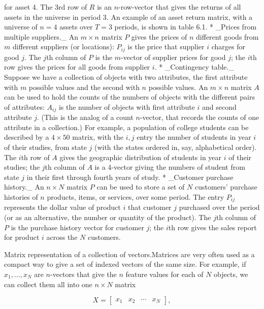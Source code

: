 for asset 4. The 3rd row of \(R\) is an \(n\)-row-vector that gives the returns of all assets in the universe in period 3. An example of an asset return matrix, with a universe of \(n=4\) assets over \(T=3\) periods, is shown in table 6.1.
* _Prices from multiple suppliers._ An \(m\times n\) matrix \(P\) gives the prices of \(n\) different goods from \(m\) different suppliers (or locations): \(P_{ij}\) is the price that supplier \(i\) charges for good \(j\). The \(j\)th column of \(P\) is the \(m\)-vector of supplier prices for good \(j\); the \(i\)th row gives the prices for all goods from supplier \(i\).
* _Contingency table._ Suppose we have a collection of objects with two attributes, the first attribute with \(m\) possible values and the second with \(n\) possible values. An \(m\times n\) matrix \(A\) can be used to hold the counts of the numbers of objects with the different pairs of attributes: \(A_{ij}\) is the number of objects with first attribute \(i\) and second attribute \(j\). (This is the analog of a count \(n\)-vector, that records the counts of one attribute in a collection.) For example, a population of college students can be described by a \(4\times 50\) matrix, with the \(i,j\) entry the number of students in year \(i\) of their studies, from state \(j\) (with the states ordered in, say, alphabetical order). The \(i\)th row of \(A\) gives the geographic distribution of students in year \(i\) of their studies; the \(j\)th column of \(A\) is a 4-vector giving the numbers of student from state \(j\) in their first through fourth years of study.
* _Customer purchase history._ An \(n\times N\) matrix \(P\) can be used to store a set of \(N\) customers' purchase histories of \(n\) products, items, or services, over some period. The entry \(P_{ij}\) represents the dollar value of product \(i\) that customer \(j\) purchased over the period (or as an alternative, the number or quantity of the product). The \(j\)th column of \(P\) is the purchase history vector for customer \(j\); the \(i\)th row gives the sales report for product \(i\) across the \(N\) customers.

Matrix representation of a collection of vectors.Matrices are very often used as a compact way to give a set of indexed vectors of the same size. For example, if \(x_{1},\ldots,x_{N}\) are \(n\)-vectors that give the \(n\) feature values for each of \(N\) objects, we can collect them all into one \(n\times N\) matrix

\[X=\left[\begin{array}{cccc}x_{1}&x_{2}&\cdots&x_{N}\end{array}\right],\]

